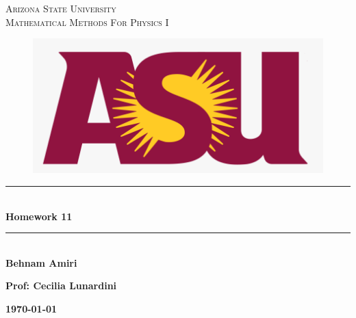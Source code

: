 \documentclass[fleqn]{article}
\begin{document}
  \begin{titlepage}

    \newcommand{\HRule}{\rule{\linewidth}{0.5mm}} %

    \center %
    


    \textsc{\LARGE Arizona State University}\\[1.5cm] %

    \textsc{\LARGE Mathematical Methods For Physics I }\\[1.5cm] %


    \begin{figure}
      \includegraphics[width=\linewidth]{asu.png}
    \end{figure}


    \HRule \\[0.4cm]
    { \huge \bfseries Homework 11}\\[0.4cm] 
    \HRule \\[1.5cm]
    
    \textbf{Behnam Amiri}

    \bigbreak

    \textbf{Prof: Cecilia Lunardini}

    \bigbreak


    \textbf{{\large \today}\\[2cm]}

    \vfill %

  \end{titlepage}
\end{document}
